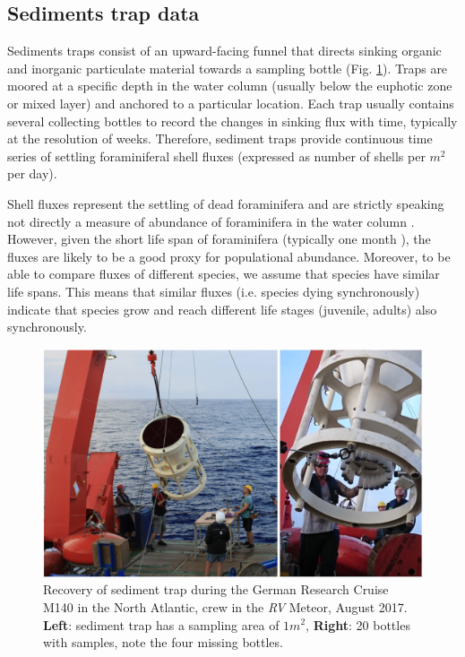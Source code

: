 



\subsection{Sediments trap data}

Sediments traps consist of an upward-facing funnel that directs sinking organic and inorganic particulate material towards a sampling bottle (Fig. \ref{fig:trap}). 
Traps are moored at a specific depth in the water column (usually below the euphotic zone or mixed layer) and anchored to a particular location. %
Each trap usually contains several collecting bottles to record the changes in sinking flux with time, typically at the resolution of weeks. %
Therefore, sediment traps provide continuous time series of settling foraminiferal shell fluxes (expressed as number of shells per $m^2$ per day). 

Shell fluxes represent the settling of dead foraminifera and are strictly speaking not directly a measure of abundance of foraminifera in the water column \cite{jonkers2015global}. However, given the short life span of foraminifera (typically one month \citep{hemleben1989modern}), the fluxes are likely to be a good proxy for populational abundance. Moreover, to be able to compare fluxes of different species, we assume that species have similar life spans. This means that similar fluxes (i.e. species dying synchronously) indicate that species grow and reach different life stages (juvenile, adults) also synchronously.

\begin{figure}
\centering
\includegraphics[width=1\textwidth]{sed_trap.png}
\caption{\label{fig:trap} Recovery of sediment trap during the German Research Cruise M140 in the North Atlantic, crew in the \textit{RV} Meteor, August 2017. \textbf{Left}: sediment trap has a sampling area of $1 m^2$, \textbf{Right}: 20 bottles with samples, note the four missing bottles.}
\end{figure}

